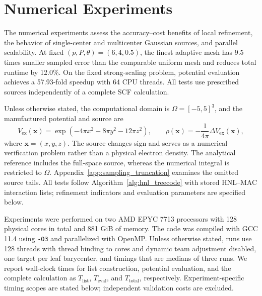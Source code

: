 \documentclass[a4paper,pdflatex,sn-mathphys-num]{sn-jnl}
\theoremstyle{thmstyleone}
\begin{document}
\section{Numerical Experiments}
\label{sec:numerical_experiments}

The numerical experiments assess the accuracy--cost benefits of local refinement, the behavior of single-center and multicenter Gaussian sources, and parallel scalability. At fixed $(p,P,\theta)=(6,4,0.5)$, the finest adaptive mesh has 9.5 times smaller sampled error than the comparable uniform mesh and reduces total runtime by 12.0\%. On the fixed strong-scaling problem, potential evaluation achieves a 57.93-fold speedup with 64 CPU threads. All tests use prescribed sources independently of a complete SCF calculation.

Unless otherwise stated, the computational domain is $\Omega=[-5,5]^3$, and the manufactured potential and source are
\begin{equation}
\label{eq:manufactured_solution}
V_{\mathrm{ex}}(\mathbf x)=\exp(-4\pi x^2-8\pi y^2-12\pi z^2),
\qquad
\rho(\mathbf x)=-\frac{1}{4\pi}\Delta V_{\mathrm{ex}}(\mathbf x),
\end{equation}
where $\mathbf x=(x,y,z)$. The source changes sign and serves as a numerical verification problem rather than a physical electron density. The analytical reference includes the full-space source, whereas the numerical integral is restricted to $\Omega$. Appendix~\ref{app:sampling_truncation} examines the omitted source tails. All tests follow Algorithm~\ref{alg:hnl_treecode} with stored HNL--MAC interaction lists; refinement indicators and evaluation parameters are specified below.

Experiments were performed on two AMD EPYC 7713 processors with 128 physical cores in total and 881 GiB of memory. The code was compiled with GCC 11.4 using \texttt{-O3} and parallelized with OpenMP. Unless otherwise stated, runs use 128 threads with thread binding to cores and dynamic team adjustment disabled, one target per leaf barycenter, and timings that are medians of three runs. We report wall-clock times for list construction, potential evaluation, and the complete calculation as $T_{\mathrm{list}}$, $T_{\mathrm{eval}}$, and $T_{\mathrm{total}}$, respectively. Experiment-specific timing scopes are stated below; independent validation costs are excluded.
\end{document}
